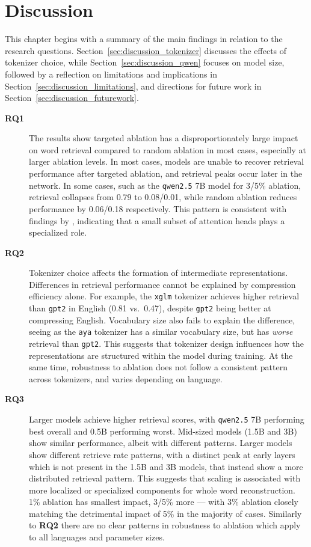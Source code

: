 \chapter{Discussion} \label{cha:discussion}

This chapter begins with a summary of the main findings in relation to the research questions. Section~\ref{sec:discussion_tokenizer} discusses the effects of tokenizer choice, while Section~\ref{sec:discussion_qwen} focuses on model size, followed by a reflection on limitations and implications in Section~\ref{sec:discussion_limitations}, and directions for future work in Section~\ref{sec:discussion_futurework}.

\begin{description}
\item[\textbf{RQ1}] The results show targeted ablation has a disproportionately large impact on word retrieval compared to random ablation in most cases, especially at larger ablation levels. In most cases, models are unable to recover retrieval performance after targeted ablation, and retrieval peaks occur later in the network. In some cases, such as the \texttt{qwen2.5} 7B model for 3/5\% ablation, retrieval collapses from 0.79 to 0.08/0.01, while random ablation reduces performance by 0.06/0.18 respectively. This pattern is consistent with findings by \citet{voita2019}, indicating that a small subset of attention heads plays a specialized role.

\item[\textbf{RQ2}] Tokenizer choice affects the formation of intermediate representations. Differences in retrieval performance cannot be explained by compression efficiency alone. For example, the \texttt{xglm} tokenizer achieves higher retrieval than \texttt{gpt2} in English (0.81 vs.\ 0.47), despite \texttt{gpt2} being better at compressing English. Vocabulary size also fails to explain the difference, seeing as the \texttt{aya} tokenizer has a similar vocabulary size, but has \textit{worse} retrieval than \texttt{gpt2}. This suggests that tokenizer design influences how the representations are structured within the model during training. At the same time, robustness to ablation does not follow a consistent pattern across tokenizers, and varies depending on language.

\item[\textbf{RQ3}] Larger models achieve higher retrieval scores, with \texttt{qwen2.5} 7B performing best overall and 0.5B performing worst. Mid-sized models (1.5B and 3B) show similar performance, albeit with different patterns. Larger models show different retrieve rate patterns, with a distinct peak at early layers which is not present in the 1.5B and 3B models, that instead show a more distributed retrieval pattern. This suggests that scaling is associated with more localized or specialized components for whole word reconstruction. 1\% ablation has smallest impact, 3/5\% more --- with 3\% ablation closely matching the detrimental impact of 5\% in the majority of cases. Similarly to \textbf{RQ2} there are no clear patterns in robustness to ablation which apply to all languages and parameter sizes.

\end{description}

